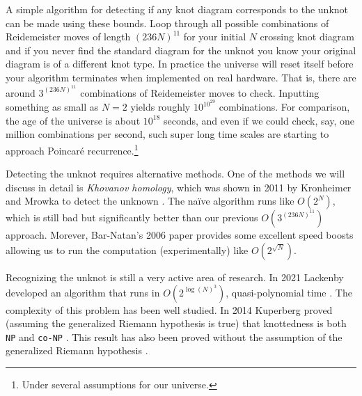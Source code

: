     A simple algorithm for detecting if any knot diagram corresponds to the
    unknot can be made using these bounds. Loop through all possible
    combinations of Reidemeister moves of length $(236N)^{11}$ for your
    initial $N$ crossing knot diagram and if you never
    find the standard diagram for the unknot you know your original diagram
    is of a different knot type. In practice the universe will reset itself
    before your algorithm terminates when implemented on real hardware. That is,
    there are around $3^{(236N)^{11}}$ combinations of Reidemeister moves to
    check. Inputting something as small as $N=2$ yields roughly
    $10^{10^{29}}$ combinations. For comparison, the age of the universe is
    about $10^{18}$ seconds, and even if we could check, say, one million
    combinations per second, such super long time scales are starting to
    approach Poincar\'{e} recurrence.\footnote{%
        Under several assumptions for our universe.
    }
    \par\hfill\par
    Detecting the unknot requires alternative methods. One of the methods we
    will discuss in detail is \textit{Khovanov homology}, which was shown in
    2011 by Kronheimer and Mrowka to detect the unknown
    \cite{KronheimerMrowka2011KhovanovUnknot}. The na\"{i}ve algorithm runs
    like $O(2^{N})$, which is still bad but significantly better than our
    previous $O(3^{(236N)^{11}})$ approach. Morever,
    Bar-Natan's 2006 paper provides some excellent speed boosts
    \cite{BarNatan2006FASTKH} allowing us to run the computation
    (experimentally) like $O(2^{\sqrt{N}})$.
    \par\hfill\par
    Recognizing the unknot is still a very active area of research. In 2021
    Lackenby developed an algorithm that runs in
    $O(2^{\log(N)^{3}})$, quasi-polynomial time
    \cite{LackenBy2021QuasiPolyUnknotting}. The complexity of this problem
    has been well studied. In 2014 Kuperberg proved (assuming the generalized
    Riemann hypothesis is true) that knottedness is both \texttt{NP} and
    \texttt{co-NP} \cite{Kuperberg2014KnottednessNP}. This result has also been
    proved without the assumption of the generalized Riemann hypothesis
    \cite{Lackenby2021UnknotNP}.

